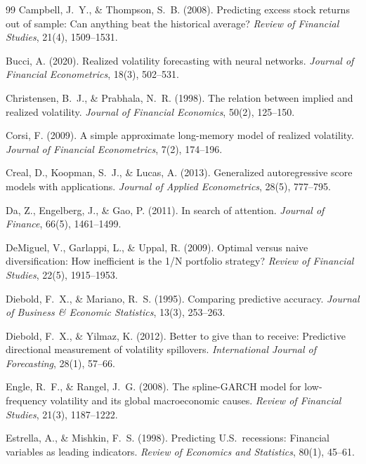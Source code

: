 \documentclass[12pt,a4paper]{article}
\begin{document}
\begin{thebibliography}{99}
Campbell, J.~Y., \& Thompson, S.~B. (2008). Predicting excess stock returns out of sample: Can anything beat the historical average? \textit{Review of Financial Studies}, 21(4), 1509--1531.

Bucci, A. (2020). Realized volatility forecasting with neural networks. \textit{Journal of Financial Econometrics}, 18(3), 502--531.

Christensen, B.~J., \& Prabhala, N.~R. (1998). The relation between implied and realized volatility. \textit{Journal of Financial Economics}, 50(2), 125--150.

Corsi, F. (2009). A simple approximate long-memory model of realized volatility. \textit{Journal of Financial Econometrics}, 7(2), 174--196.

Creal, D., Koopman, S.~J., \& Lucas, A. (2013). Generalized autoregressive score models with applications. \textit{Journal of Applied Econometrics}, 28(5), 777--795.

Da, Z., Engelberg, J., \& Gao, P. (2011). In search of attention. \textit{Journal of Finance}, 66(5), 1461--1499.

DeMiguel, V., Garlappi, L., \& Uppal, R. (2009). Optimal versus naive diversification: How inefficient is the 1/N portfolio strategy? \textit{Review of Financial Studies}, 22(5), 1915--1953.

Diebold, F.~X., \& Mariano, R.~S. (1995). Comparing predictive accuracy. \textit{Journal of Business \& Economic Statistics}, 13(3), 253--263.

Diebold, F.~X., \& Yilmaz, K. (2012). Better to give than to receive: Predictive directional measurement of volatility spillovers. \textit{International Journal of Forecasting}, 28(1), 57--66.

Engle, R.~F., \& Rangel, J.~G. (2008). The spline-GARCH model for low-frequency volatility and its global macroeconomic causes. \textit{Review of Financial Studies}, 21(3), 1187--1222.

Estrella, A., \& Mishkin, F.~S. (1998). Predicting U.S.\ recessions: Financial variables as leading indicators. \textit{Review of Economics and Statistics}, 80(1), 45--61.


\end{thebibliography}
\end{document}
